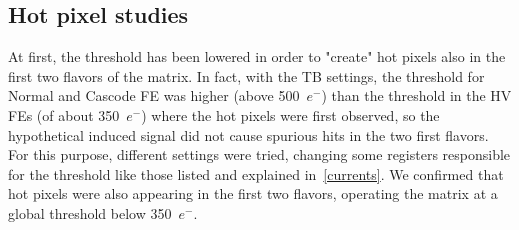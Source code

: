 






\subsection{Hot pixel studies}


At first, the threshold has been lowered in order to "create" hot pixels also in the first two flavors of the matrix. In fact, with the TB settings, the threshold for Normal and Cascode FE was higher (above 500~$e^{-}$) than the threshold in the HV FEs (of about 350~$e^{-}$) where the hot pixels were first observed, so the hypothetical induced signal did not cause spurious hits in the two first flavors. For this purpose, different settings were tried, changing some registers responsible for the threshold like those listed and explained in~\autoref{currents}. 
We confirmed that hot pixels were also appearing in the first two flavors, operating the matrix at a global threshold below 350~$e^{-}$. 

